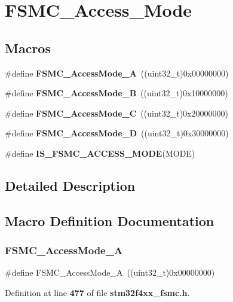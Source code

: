 \section{F\+S\+M\+C\+\_\+\+Access\+\_\+\+Mode}
\label{group__FSMC__Access__Mode}
\subsection*{Macros}
\begin{DoxyCompactItemize}
\item 
\#define \textbf{ F\+S\+M\+C\+\_\+\+Access\+Mode\+\_\+A}~((uint32\+\_\+t)0x00000000)
\item 
\#define \textbf{ F\+S\+M\+C\+\_\+\+Access\+Mode\+\_\+B}~((uint32\+\_\+t)0x10000000)
\item 
\#define \textbf{ F\+S\+M\+C\+\_\+\+Access\+Mode\+\_\+C}~((uint32\+\_\+t)0x20000000)
\item 
\#define \textbf{ F\+S\+M\+C\+\_\+\+Access\+Mode\+\_\+D}~((uint32\+\_\+t)0x30000000)
\item 
\#define \textbf{ I\+S\+\_\+\+F\+S\+M\+C\+\_\+\+A\+C\+C\+E\+S\+S\+\_\+\+M\+O\+DE}(M\+O\+DE)
\end{DoxyCompactItemize}


\subsection{Detailed Description}


\subsection{Macro Definition Documentation}
\mbox{\label{group__FSMC__Access__Mode_gae0f299b51c12257311694c4a8f5c00c3}} 
\subsubsection{F\+S\+M\+C\+\_\+\+Access\+Mode\+\_\+A}
{\footnotesize\ttfamily \#define F\+S\+M\+C\+\_\+\+Access\+Mode\+\_\+A~((uint32\+\_\+t)0x00000000)}



Definition at line \textbf{ 477} of file \textbf{ stm32f4xx\+\_\+fsmc.\+h}.

